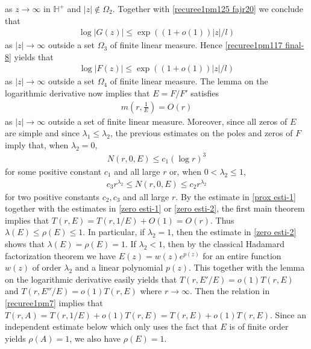 \documentclass[12pt]{amsart}
\numberwithin{equation}{section}
\begin{document}
as $z\to\infty$ in $\mathbb{H}^{+}$ and $|z|\not\in \Omega_2$. Together with \eqref{recuree1pm125  fajr20} we conclude that
\begin{equation*}%
\begin{split}
\log|G(z)|\leq \exp((1+o(1))|z|/l)
\end{split}
\end{equation*}
as $|z|\to\infty$ outside a set $\Omega_3$ of finite linear measure. Hence \eqref{recuree1pm117 final-8} yields that
\begin{equation*}%
\begin{split}
\log|F(z)|\leq \exp((1+o(1))|z|/l)
\end{split}
\end{equation*}
as $|z|\to\infty$ outside a set $\Omega_4$ of finite linear measure. The lemma on the logarithmic derivative now implies that $E=F/F'$ satisfies
\begin{equation}\label{prox esti-1}
\begin{split}
m\left(r,\frac{1}{E}\right)=O(r)
\end{split}
\end{equation}
as $|z|\to\infty$ outside a set of finite linear measure. Moreover, since all zeros of $E$ are simple and since $\lambda_1\leq \lambda_2$, the previous estimates on the poles and zeros of $F$ imply that, when $\lambda_2=0$,
\begin{equation}\label{zero esti-1}
\begin{split}
N(r,0,E)\leq c_1(\log r)^3
\end{split}
\end{equation}
for some positive constant $c_1$ and all large $r$ or, when $0<\lambda_2\leq 1$,
\begin{equation}\label{zero esti-2}
\begin{split}
c_3 r^{\lambda_2} \leq N(r,0,E)\leq c_2 r^{\lambda_2}
\end{split}
\end{equation}
for two positive constants $c_2,c_3$ and all large $r$. By the estimate in \eqref{prox esti-1} together with the estimates in \eqref{zero esti-1} or \eqref{zero esti-2}, the first main theorem implies that $T(r,E)=T(r,1/E)+O(1)=O(r)$. Thus $\lambda(E)\leq \rho(E)\leq 1$. In particular, if $\lambda_2=1$, then the estimate in \eqref{zero esti-2} shows that $\lambda(E)=\rho(E)=1$. If $\lambda_2<1$, then by the classical Hadamard factorization theorem we have $E(z)=w(z)e^{p(z)}$ for an entire function $w(z)$ of order $\lambda_2$ and a linear polynomial $p(z)$. This together with the lemma on the logarithmic derivative easily yields that $T(r,E'/E)=o(1)T(r,E)$ and $T(r,E''/E)=o(1)T(r,E)$ where $r\to\infty$. Then the relation in \eqref{recuree1pm7} implies that $T(r,A)=T(r,1/E)+o(1)T(r,E)=T(r,E)+o(1)T(r,E)$. Since an independent estimate below which only uses the fact that $E$ is of finite order yields $\rho(A)=1$, we also have $\rho(E)=1$.
\end{document}
